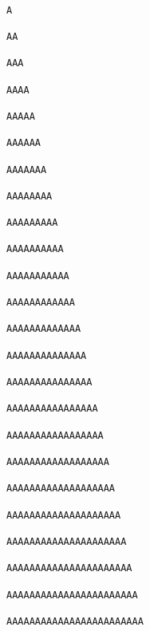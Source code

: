 \begin{lstlisting}
                                                                                A
                                                                               AA
                                                                              AAA
                                                                             AAAA
                                                                            AAAAA
                                                                           AAAAAA
                                                                          AAAAAAA
                                                                         AAAAAAAA
                                                                        AAAAAAAAA
                                                                       AAAAAAAAAA
                                                                      AAAAAAAAAAA
                                                                     AAAAAAAAAAAA
                                                                    AAAAAAAAAAAAA
                                                                   AAAAAAAAAAAAAA
                                                                  AAAAAAAAAAAAAAA
                                                                 AAAAAAAAAAAAAAAA
                                                                AAAAAAAAAAAAAAAAA
                                                               AAAAAAAAAAAAAAAAAA
                                                              AAAAAAAAAAAAAAAAAAA
                                                             AAAAAAAAAAAAAAAAAAAA
                                                            AAAAAAAAAAAAAAAAAAAAA
                                                           AAAAAAAAAAAAAAAAAAAAAA
                                                          AAAAAAAAAAAAAAAAAAAAAAA
                                                         AAAAAAAAAAAAAAAAAAAAAAAA
\end{lstlisting}


